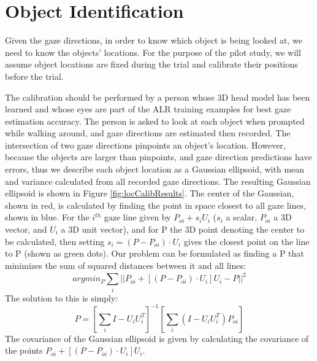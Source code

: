\section{Object Identification}
Given the gaze directions, in order to know which object is being looked at, we need to know the objects' locations.  For the purpose of the pilot study, we will assume object locations are fixed during the trial and calibrate their positions before the trial.


The calibration should be performed by a person whose 3D head model has been learned and whose eyes are part of the ALR training examples for best gaze estimation accuracy.  The person is asked to look at each object when prompted while walking around, and gaze directions are estimated then recorded.  The intersection of two gaze directions pinpoints an object's location.  However, because the objects are larger than pinpoints, and gaze direction predictions have errors, thus we describe each object location as a Gaussian ellipsoid, with mean and variance calculated from all recorded gaze directions.  The resulting Gaussian ellipsoid is shown in Figure \ref{fig:locCalibResults}.  The center of the Gaussian, shown in red, is calculated by finding the point in space closest to all gaze lines, shown in blue.  For the \(i^{th}\) gaze line given by \(P_{oi} + s_i U_i\) (\(s_i\) a scalar, \(P_{oi}\) a 3D vector, and \(U_i\) a 3D unit vector), and for P the 3D point denoting the center to be calculated, then setting \(s_i = (P - P_{oi})\cdot{U_i} \) gives the closest point on the line to P (shown as green dots).  Our problem can be formulated as finding a P that minimizes the sum of squared distances between it and all lines:
\[ argmin_P \sum_{i}^{} || P_{oi} + [(P - P_{oi})\cdot{U_i}]U_i - P ||^2 \]
The solution to this is simply:
\[ P = [ \sum_{i}^{} I - U_i U_i^T ]^{-1}  [ \sum_{i}^{}(I - U_i U_i^T)P_{oi} ]   \]
The covariance of the Gaussian ellipsoid is given by calculating the covariance of the points \(P_{oi} + [(P - P_{oi})\cdot{U_i}]U_i\).
